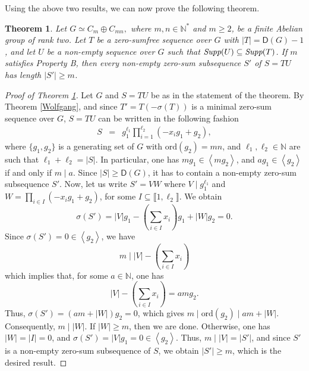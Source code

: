 \documentclass[english,12pt,a4paper,twoside]{smfart}
\theoremstyle{plain}
\newtheorem{theorem}{Theorem}[section]
\theoremstyle{definition}
\theoremstyle{remark}
\begin{document}
Using the above two results, we can now prove the following theorem.

\begin{theorem}\label{Longues sous-suites de somme zero} Let $G \simeq C_{m} \oplus C_{mn},$ where $m,n \in \mathbb{N}^*$ and $m \geq 2$, be a finite Abelian group of rank two. Let $T$ be a zero-sumfree sequence over $G$ with $\left|T\right|=\mathsf{D}(G)-1$, and let $U$ be a non-empty sequence over $G$ such that $\text{\em Supp\em}(U) \subseteq \text{\em Supp\em}(T)$. If $m$ satisfies Property B, then every non-empty zero-sum subsequence $S'$ of $S=TU$ has length $\left|S'\right| \geq m$.
\end{theorem}

\begin{proof} [Proof of Theorem \ref{Longues sous-suites de somme zero}] Let $G$ and $S=TU$ be as in the statement of the theorem. By Theorem \ref{Wolfgang}, and since $T'=T(-\sigma(T))$ is a minimal zero-sum sequence over $G$, $S=TU$ can be written in the following fashion
\begin{eqnarray*}
S & = & g^{\ell_1}_1 \displaystyle\prod^{\ell_2}_{i=1} \left(-x_ig_1 + g_2\right),
\end{eqnarray*}
where $\{g_1, g_2\}$ is a generating set of $G$ with $\text{ord}(g_2)=mn$, and $\ell_1,\ell_2 \in \mathbb{N}$ are such that $\ell_1+\ell_2=\left|S\right|$. In particular, one has $mg_1 \in \left\langle mg_2\right\rangle$, and $ag_1 \in \left\langle g_2\right\rangle$ if and only if $m \mid a$. Since $\left|S\right| \geq \mathsf{D}(G)$, it has to contain a non-empty zero-sum subsequence $S'$. Now, let us write $S'=VW$ where $V \mid g^{\ell_1}_1$ and $W=\prod_{i \in I} \left(-x_ig_1 + g_2\right)$, for some $I \subseteq \llbracket 1,\ell_2 \rrbracket$. We obtain
$$\sigma(S')=\left|V\right|g_1 - \left(\displaystyle\sum_{i \in I}x_i\right)g_1 + \left|W\right|g_2=0.$$
Since $\sigma(S')=0 \in \left\langle g_2 \right\rangle$, we have 
$$m \mid \left|V\right|-\left(\displaystyle\sum_{i \in I}x_i\right)$$ 
which implies that, for some $a \in \mathbb{N}$, one has 
$$\left|V\right|-\left(\displaystyle\sum_{i \in I}x_i\right)=amg_2.$$
Thus, $\sigma(S')=\left(am+\left|W\right|\right)g_2=0$, which gives $m \mid \text{ord}(g_2) \mid am + \left|W\right|$. Consequently, $m \mid \left|W\right|$. If $\left|W\right| \geq m$, then we are done. Otherwise, one has $\left|W\right|=\left|I\right|=0$, and $\sigma(S') = \left|V\right|g_1= 0 \in \left\langle g_2\right\rangle$. Thus, $m \mid \left|V\right|=\left|S'\right|$, and since $S'$ is a non-empty zero-sum subsequence of $S$, we obtain $\left|S'\right| \geq m$, which is the desired result.
\end{proof}
\end{document}
